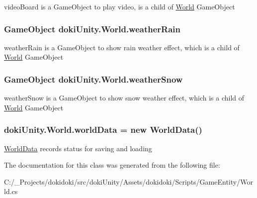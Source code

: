 video\+Board is a Game\+Object to play video, is a child of \hyperlink{classdoki_unity_1_1_world}{World} Game\+Object 

\subsubsection[{\texorpdfstring{weather\+Rain}{weatherRain}}]{\setlength{\rightskip}{0pt plus 5cm}Game\+Object doki\+Unity.\+World.\+weather\+Rain}\hypertarget{classdoki_unity_1_1_world_ac49a0f2e620b31eb86a38adac5c99ac8}{}\label{classdoki_unity_1_1_world_ac49a0f2e620b31eb86a38adac5c99ac8}


weather\+Rain is a Game\+Object to show rain weather effect, which is a child of \hyperlink{classdoki_unity_1_1_world}{World} Game\+Object 

\subsubsection[{\texorpdfstring{weather\+Snow}{weatherSnow}}]{\setlength{\rightskip}{0pt plus 5cm}Game\+Object doki\+Unity.\+World.\+weather\+Snow}\hypertarget{classdoki_unity_1_1_world_a6e987903e3c1bdd1884076bf058fc15d}{}\label{classdoki_unity_1_1_world_a6e987903e3c1bdd1884076bf058fc15d}


weather\+Snow is a Game\+Object to show snow weather effect, which is a child of \hyperlink{classdoki_unity_1_1_world}{World} Game\+Object 

\subsubsection[{\texorpdfstring{world\+Data}{worldData}}]{ doki\+Unity.\+World.\+world\+Data = new {\bf World\+Data}()}\hypertarget{classdoki_unity_1_1_world_a3e521b89596af805bc18166709368d7e}{}\label{classdoki_unity_1_1_world_a3e521b89596af805bc18166709368d7e}


\hyperlink{classdoki_unity_1_1_world_data}{World\+Data} records status for saving and loading 



The documentation for this class was generated from the following file\+:\begin{DoxyCompactItemize}
\item 
C\+:/\+\_\+\+Projects/dokidoki/src/doki\+Unity/\+Assets/dokidoki/\+Scripts/\+Game\+Entity/World.\+cs\end{DoxyCompactItemize}
